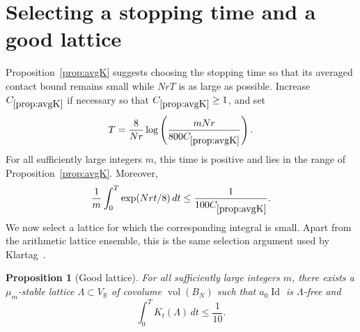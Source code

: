 \documentclass[11pt]{article}
\newtheorem{proposition}[theorem]{Proposition}
\theoremstyle{remark}
\newcommand{\R}{\mathbb R}
\newcommand{\vol}{\operatorname{vol}}
\newcommand{\Id}{\operatorname{Id}}
\begin{document}
\section{Selecting a stopping time and a good lattice}

Proposition~\ref{prop:avgK} suggests choosing the stopping time so that its
averaged contact bound remains small while $NrT$ is as large as possible.
Increase $C_{\ref{prop:avgK}}$ if necessary so that
$C_{\ref{prop:avgK}}\ge1$, and set
\begin{equation}
        T=\frac8{Nr}\log\left(\frac{mNr}{800C_{\ref{prop:avgK}}}\right).
\label{eq:chosen-time}
\end{equation}
For all sufficiently large integers $m$, this time is positive and lies in
the range of Proposition~\ref{prop:avgK}.  Moreover,
\[
        \frac1m\int_0^T\exp(Nrt/8)\,dt
        \le\frac1{100C_{\ref{prop:avgK}}}.
\]
We now select a lattice for which the corresponding integral is small.  Apart
from the arithmetic lattice ensemble, this is the same selection argument
used by Klartag~\cite[proof of Proposition~5.1]{Klartag}.

\begin{proposition}[Good lattice]\label{prop:good-lattice}
For all sufficiently large integers $m$, there exists a $\mu_m$-stable
lattice $\Lambda\subset V_\R$ of covolume $\vol(B_N)$ such that $a_0\Id$ is
$\Lambda$-free and
\[
        \int_0^T K_t(\Lambda)\,dt\le\frac1{10}.
\]
\end{proposition}
\end{document}
